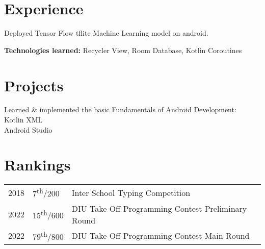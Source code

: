 \documentclass[]{deedy-resume-openfont}
\begin{document}
\begin{minipage}[t]{0.66\textwidth} 


\section{Experience}

\vspace{\topsep} %
\begin{tightemize}
\item Deployed Tensor Flow tflite Machine Learning model on android.
\item \textbf{Technologies learned: } Recycler View, Room Database, Kotlin Coroutines
\end{tightemize}
\sectionsep







\section{Projects}

\begin{tightemize}
\item Learned \& implemented the basic Fundamentals of Android Development: \\
\quad \textbullet{} Kotlin \textbullet{} XML \\
\quad \textbullet{} Android Studio \\
\end{tightemize}
\sectionsep



\section{Rankings} 
\begin{tabular}{rll}
2018	 & 7\textsuperscript{th}/200   & Inter School Typing Competition\\
2022	 & 15\textsuperscript{th}/600  & DIU Take Off Programming Contest Preliminary Round \\
2022	 & 79\textsuperscript{th}/800  & DIU Take Off Programming Contest Main Round \\
\end{tabular}
\sectionsep



\end{minipage}
\end{document}
